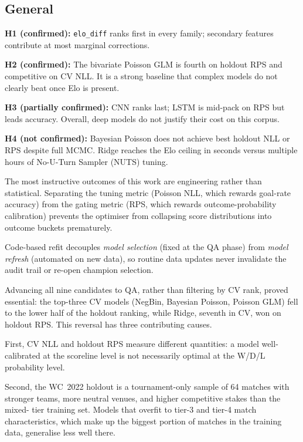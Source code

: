 \documentclass[conference]{IEEEtran}
\begin{document}
\subsection{General}

\textbf{H1 (confirmed):} \texttt{elo\_diff} ranks first in every family;
secondary features contribute at most marginal corrections.

\textbf{H2 (confirmed):} The bivariate Poisson GLM is fourth on holdout RPS and 
competitive on CV NLL. It is a strong baseline that complex models do not clearly 
beat once Elo is present.

\textbf{H3 (partially confirmed):} CNN ranks last; LSTM is mid-pack on RPS but
leads accuracy. Overall, deep models do not justify their cost on this corpus.

\textbf{H4 (not confirmed):} Bayesian Poisson does not achieve best holdout NLL
or RPS despite full MCMC. Ridge reaches the Elo ceiling in seconds versus 
multiple hours of No-U-Turn Sampler (NUTS) tuning.

The most instructive outcomes of this work are engineering rather than 
statistical. 
Separating the tuning metric (Poisson NLL, which rewards goal-rate
accuracy) from the gating metric (RPS, which rewards outcome-probability
calibration) prevents the optimiser from collapsing score distributions into
outcome buckets prematurely. 

Code-based refit decouples \emph{model selection} (fixed at the QA phase) from \emph{model refresh} (automated on new data), so routine data updates never invalidate the audit trail or re-open champion selection.

Advancing all nine candidates to QA, rather than
filtering by CV rank, proved essential: the top-three CV models (NegBin, Bayesian Poisson, Poisson GLM) fell to the lower half of the holdout ranking, while Ridge, seventh in CV, won on holdout RPS. This reversal has three contributing causes. 

First, CV NLL and holdout RPS measure different quantities: a model well-
calibrated at the scoreline level is not necessarily optimal at the W/D/L 
probability level. 

Second, the WC~2022 holdout is a tournament-only sample of 64 matches with 
stronger teams, more neutral venues, and higher competitive stakes than the mixed-
tier training set. Models that overfit to tier-3 and tier-4 match 
characteristics, which make up the biggest portion of matches in the training 
data, generalise less well there. 
\end{document}
